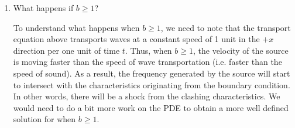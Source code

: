 \documentclass[a4paper,12pt]{article}
\begin{document}
\begin{enumerate}[label = \textbf{(\alph*)}]
        \item What happens if $ b \geq 1 $?
        
        To understand what happens when $ b \geq 1 $, we need to note that the transport equation above transports waves at a constant speed of 1 unit in the $ +x $ direction per one unit of time $ t $. Thus, when $ b \geq 1$, the velocity of the source is moving faster than the speed of wave transportation (i.e. faster than the speed of sound). As a result, the frequency generated by the source will start to intersect with the characteristics originating from the boundary condition. In other words, there will be a shock from the clashing characteristics. We would need to do a bit more work on the PDE to obtain a more well defined solution for when $ b \geq 1 $.
    \end{enumerate}
\end{document}

